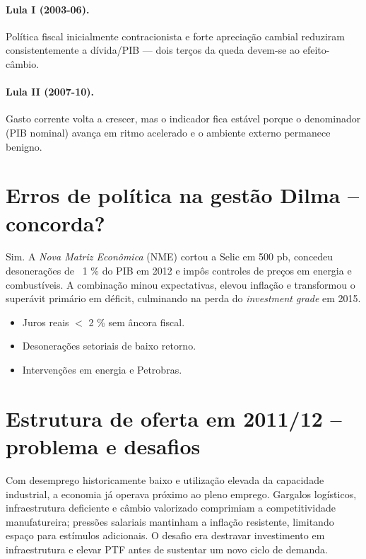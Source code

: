 \documentclass{sciposter}
\begin{document}
\begin{multicols}{3}
\paragraph{Lula I (2003-06).} Política fiscal inicialmente contracionista e forte apreciação cambial reduziram consistentemente a dívida/PIB — dois terços da queda devem-se ao efeito-câmbio.  

\paragraph{Lula II (2007-10).} Gasto corrente volta a crescer, mas o indicador fica estável porque o denominador (PIB nominal) avança em ritmo acelerado e o ambiente externo permanece benigno.

\section{\textbf{Erros de política na gestão Dilma – concorda?}}

Sim. A \emph{Nova Matriz Econômica} (NME) cortou a Selic em 500 pb, concedeu desonerações de ~1 \% do PIB em 2012 e impôs controles de preços em energia e combustíveis. A combinação minou expectativas, elevou inflação e transformou o superávit primário em déficit, culminando na perda do \emph{investment grade} em 2015. 

\begin{itemize}
  \item Juros reais \(<\) 2 \% sem âncora fiscal. 
  \item Desonerações setoriais de baixo retorno. 
  \item Intervenções em energia e Petrobras. 
\end{itemize}

\section{\textbf{Estrutura de oferta em 2011/12 – problema e desafios}}

Com desemprego historicamente baixo e utilização elevada da capacidade industrial, a economia já operava próximo ao pleno emprego. Gargalos logísticos, infraestrutura deficiente e câmbio valorizado comprimiam a competitividade manufatureira; pressões salariais mantinham a inflação resistente, limitando espaço para estímulos adicionais. O desafio era destravar investimento em infraestrutura e elevar PTF antes de sustentar um novo ciclo de demanda. 


\end{multicols}
\end{document}

